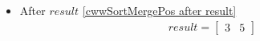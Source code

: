 \begin{frame}[containsverbatim]{\cwwalgortihmexampleframe}
\begin{columns}[c]
\begin{column}{0.65\textwidth}
\begin{multicols}{2}
\begin{itemize}
                            \item After $result$ \cref{cwwSortMergePos after result}
                            \begin{align*}
                                result = \begin{bmatrix}3 & 5\end{bmatrix}
                            \end{align*}
                        \end{itemize}
                    \end{multicols}
                \end{column}
            \end{columns}
        \end{frame}

